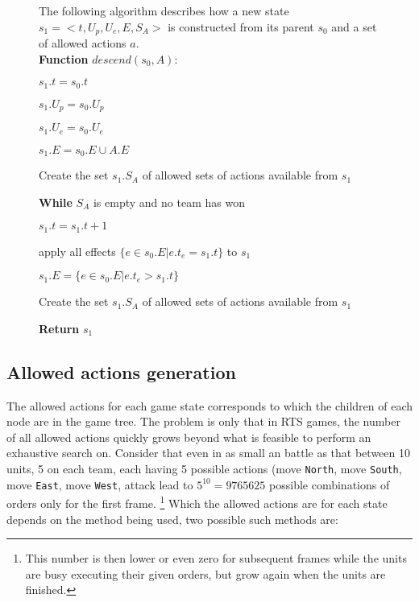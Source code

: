\begin{figure}[h!t]
\begin{algorithm}
The following algorithm describes how a new state $s_1=<t,U_p,U_e,E,S_A>$ is constructed from its parent $s_0$ and a set of allowed actions $a$. \ \\

\textbf{Function} $descend(s_0,A)$:
\begin{enum}
\item $s_1.t = s_0.t$
\item $s_1.U_p = s_0.U_p$
\item $s_1.U_e = s_0.U_e$
\item $s_1.E = s_0.E \cup A.E$
\item Create the set $s_1.S_A$ of allowed sets of actions available from $s_1$

\item \textbf{While} $S_A$ is empty and no team has won
\begin{enum}
	\item $s_1.t = s_1.t + 1$
	\item apply all effects $\{e \in s_0.E | e.t_e = s_1.t\}$ to $s_1$
	\item $s_1.E = \{e \in s_0.E | e.t_e > s_1.t\}$
	\item Create the set $s_1.S_A$ of allowed sets of actions available from $s_1$
\end{enum}

\item \textbf{Return} $s_1$

\end{enum}
\label{algGeneration}
\end{algorithm}
\end{figure}



\subsection{Allowed actions generation}
The allowed actions for each game state corresponds to which the children of each node are in the game tree.
The problem is only that in RTS games, the number of all allowed actions quickly grows beyond what is feasible to perform an exhaustive search on.
Consider that even in as small an battle as that between 10 units, 5 on each team, each having 5 possible actions
(move \texttt{North}, move \texttt{South}, move \texttt{East}, move \texttt{West}, attack
lead to $5^{10} = 9765625$ possible combinations of orders only for the first frame.
\footnote{This number is then lower or even zero for subsequent frames while the units are busy executing their given orders, but grow again when the units are finished.}
Which the allowed actions are for each state depends on the method being used, two possible such methods are:


